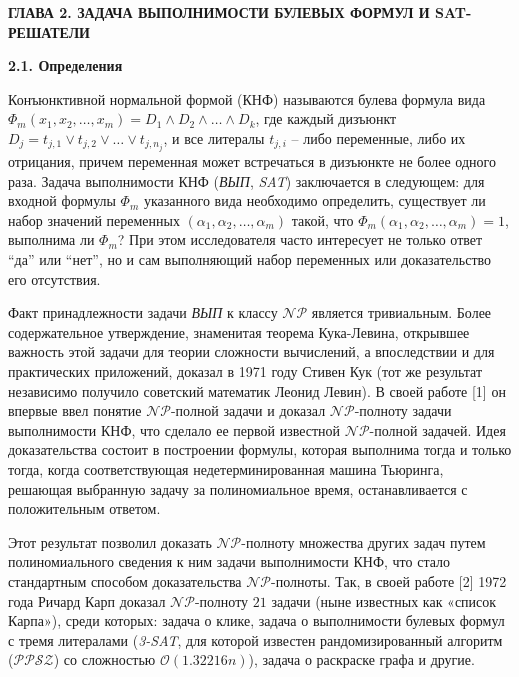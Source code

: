 
\newpage
\begin{center}
\noindent\textbf{ГЛАВА 2. ЗАДАЧА ВЫПОЛНИМОСТИ БУЛЕВЫХ ФОРМУЛ И SAT-РЕШАТЕЛИ}\label{chapters:2}
\vspace{1.5mm}
\end{center}

\vspace{5pt}
\textbf{2.1. Определения}\label{chapters:2.1}
\vspace{5pt}

Конъюнктивной нормальной формой (КНФ) называются булева формула вида 
$\Phi_m \left( x_1, x_2, \dots, x_m \right) = D_1 \land D_2 \land \dots \land D_k$,
где каждый дизъюнкт $D_j=t_{j,1} \lor t_{j,2} \lor \dots \lor t_{j,n_j}$, 
и все литералы $t_{j,i}$ – либо переменные, либо их отрицания,
причем переменная может встречаться в дизъюнкте не более одного раза. 
Задача выполнимости КНФ (\textit{ВЫП}, \textit{SAT}) заключается в следующем: для входной формулы $\Phi_m$ указанного вида 
необходимо определить, существует ли набор значений переменных $\left( \alpha_1, \alpha_2, \dots, \alpha_m \right)$ такой,
что $\Phi_m \left( \alpha_1, \alpha_2, \dots, \alpha_m \right) = 1$, выполнима ли $\Phi_m$? 
При этом исследователя часто интересует не только ответ \enquote{да} или \enquote{нет}, но и сам выполняющий набор переменных или доказательство его отсутствия.

Факт принадлежности задачи \textit{ВЫП} к классу $\mathcal{NP}$ является тривиальным. Более содержательное утверждение, 
знаменитая теорема Кука-Левина, открывшее важность этой задачи для теории сложности вычислений, 
а впоследствии и для практических приложений, доказал в 1971 году Стивен Кук (тот же результат независимо получило советский математик Леонид Левин). В своей работе [1] он впервые ввел понятие $\mathcal{NP}$-полной задачи и доказал $\mathcal{NP}$-полноту 
задачи выполнимости КНФ, что сделало ее первой известной $\mathcal{NP}$-полной задачей. 
Идея доказательства состоит в построении формулы, которая выполнима тогда и только тогда, когда соответствующая 
недетерминированная машина Тьюринга, решающая выбранную задачу за полиномиальное время, останавливается с положительным ответом.

Этот результат позволил доказать $\mathcal{NP}$-полноту множества других задач путем полиномиального сведения к ним задачи выполнимости КНФ, что стало стандартным способом доказательства $\mathcal{NP}$-полноты. 
Так, в своей работе [2] 1972 года Ричард Карп доказал $\mathcal{NP}$-полноту $21$ задачи (ныне известных как «список Карпа»), 
среди которых: задача о клике, задача о выполнимости булевых формул с тремя литералами (\textit{3-SAT}, 
для которой известен рандомизированный алгоритм ($\mathcal{PPSZ}$) со сложностью $\mathcal{O} \left( 1.32216n \right)$), 
задача о раскраске графа и другие.

